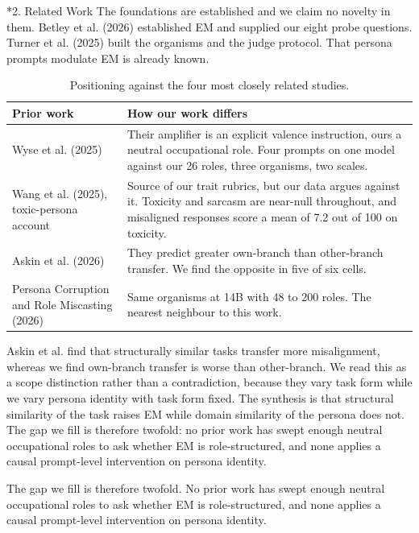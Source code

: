 \documentclass[10pt,letterpaper]{article}
\makeatletter
\renewcommand\section{\@startsection{section}{1}{0pt}{-5pt plus -1pt}{1.5pt}%
  {\normalfont\large\bfseries}}
\makeatother
\begin{document}
\section*{2. Related Work}
The foundations are established and we claim no novelty in them. Betley et al. (2026) established EM and supplied our eight probe questions. Turner et al. (2025) built the organisms and the judge protocol. That persona prompts modulate EM is already known.

\begin{table}[htbp]\centering\footnotesize
\begin{tabularx}{\linewidth}{lX}
\toprule
\textbf{Prior work} & \textbf{How our work differs} \\
\midrule
Wyse et al. (2025) & Their amplifier is an explicit valence instruction, ours a neutral occupational role. Four prompts on one model against our 26 roles, three organisms, two scales. \\
Wang et al. (2025), toxic-persona account & Source of our trait rubrics, but our data argues against it. Toxicity and sarcasm are near-null throughout, and misaligned responses score a mean of 7.2 out of 100 on toxicity. \\
Askin et al. (2026) & They predict greater own-branch than other-branch transfer. We find the opposite in five of six cells. \\
Persona Corruption and Role Miscasting (2026) & Same organisms at 14B with 48 to 200 roles. The nearest neighbour to this work. \\
\bottomrule
\end{tabularx}
\caption{Positioning against the four most closely related studies.}
\end{table}

Askin et al. find that structurally similar tasks transfer more misalignment, whereas we find own-branch transfer is worse than other-branch. We read this as a scope distinction rather than a contradiction, because they vary task form while we vary persona identity with task form fixed. The synthesis is that structural similarity of the task raises EM while domain similarity of the persona does not. The gap we fill is therefore twofold: no prior work has swept enough neutral occupational roles to ask whether EM is role-structured, and none applies a causal prompt-level intervention on persona identity.

The gap we fill is therefore twofold. No prior work has swept enough neutral occupational roles to ask whether EM is role-structured, and none applies a causal prompt-level intervention on persona identity.
\end{document}
